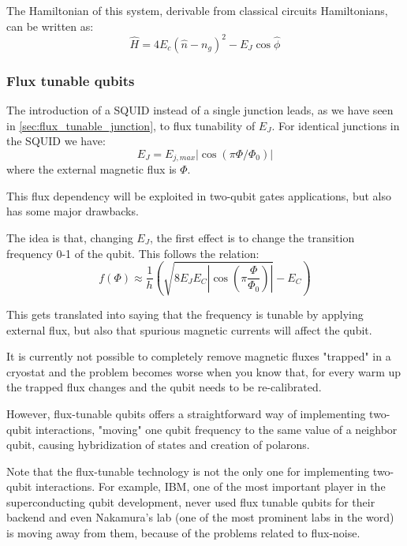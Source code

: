 The Hamiltonian of this system, derivable from classical circuits Hamiltonians, can be written as:
\begin{equation}\label{eq:hamiltonian_transmon}
    \hat H = 4 E_c (\hat n - n_g ) ^ 2 - E_J \cos \hat\phi
\end{equation}

\subsubsection{Flux tunable qubits}\label{sec:flux_tunable_qubits}

The introduction of a SQUID instead of a single junction leads, as we have seen in \cref{sec:flux_tunable_junction}, to flux tunability of $E_J$. For identical junctions in the SQUID we have:
\begin{equation}
    E_J = E_{j,max} \left|  \cos (\pi \Phi / \Phi_0)  \right|
\end{equation}
where the external magnetic flux is $\Phi$.

This flux dependency will be exploited in two-qubit gates applications, but also has some major drawbacks.

The idea is that, changing $E_J$, the first effect is to change the transition frequency 0-1 of the qubit. This follows the relation:
\begin{equation}
    f (\Phi) \approx \frac{1}{h} \left ( \sqrt{8 E_J E_C \left| \cos \left ( \pi \frac{\Phi}{\Phi_0} \right) \right|} - E_C \right)
\end{equation}

This gets translated into saying that the frequency is tunable by applying external flux, but also that spurious magnetic currents will affect the qubit.

It is currently not possible to completely remove magnetic fluxes "trapped" in a cryostat and the problem becomes worse when you know that, for every warm up the trapped flux changes and the qubit needs to be re-calibrated.

However, flux-tunable qubits offers a straightforward way of implementing two-qubit interactions, "moving" one qubit frequency to the same value of a neighbor qubit, causing hybridization of states and creation of polarons.

Note that the flux-tunable technology is not the only one for implementing two-qubit interactions. For example, IBM, one of the most important player in the superconducting qubit development, never used flux tunable qubits for their backend and even Nakamura's lab (one of the most prominent labs in the word) is moving away from them, because of the problems related to flux-noise.


